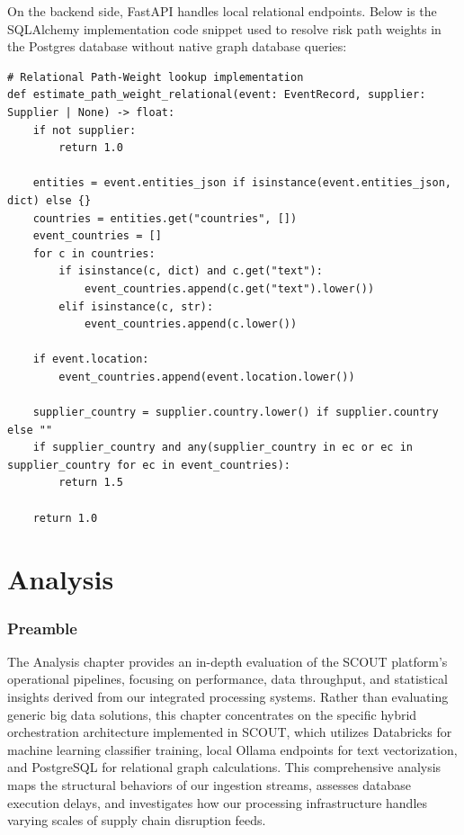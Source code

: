 \documentclass[12pt]{report}
\begin{document}
On the backend side, FastAPI handles local relational endpoints. Below is the SQLAlchemy implementation code snippet used to resolve risk path weights in the Postgres database without native graph database queries:

\begin{verbatim}
# Relational Path-Weight lookup implementation
def estimate_path_weight_relational(event: EventRecord, supplier: Supplier | None) -> float:
    if not supplier:
        return 1.0

    entities = event.entities_json if isinstance(event.entities_json, dict) else {}
    countries = entities.get("countries", [])
    event_countries = []
    for c in countries:
        if isinstance(c, dict) and c.get("text"):
            event_countries.append(c.get("text").lower())
        elif isinstance(c, str):
            event_countries.append(c.lower())

    if event.location:
        event_countries.append(event.location.lower())

    supplier_country = supplier.country.lower() if supplier.country else ""
    if supplier_country and any(supplier_country in ec or ec in supplier_country for ec in event_countries):
        return 1.5

    return 1.0
\end{verbatim}

\newpage
\chapter{Analysis}
\thispagestyle{fancy}

\subsection{Preamble}
The Analysis chapter provides an in-depth evaluation of the SCOUT platform's operational pipelines, focusing on performance, data throughput, and statistical insights derived from our integrated processing systems. Rather than evaluating generic big data solutions, this chapter concentrates on the specific hybrid orchestration architecture implemented in SCOUT, which utilizes Databricks for machine learning classifier training, local Ollama endpoints for text vectorization, and PostgreSQL for relational graph calculations. This comprehensive analysis maps the structural behaviors of our ingestion streams, assesses database execution delays, and investigates how our processing infrastructure handles varying scales of supply chain disruption feeds.
\end{document}

